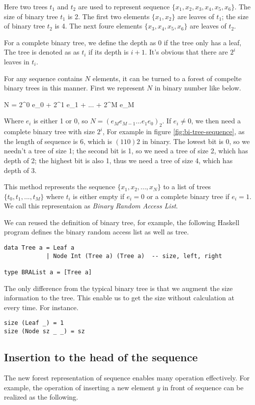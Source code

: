 \documentclass{article}
\begin{document}
Here two trees $t_1$ and $t_2$ are used to represent sequence $\{x_1, x_2, x_3, x_4, x_5, x_6\}$. 
The size of binary tree $t_1$ is 2. The first two elements $\{x_1, x_2\}$ are leaves of $t_1$;
the size of binary tree $t_2$ is 4. The next foure elements $\{x_3, x_4, x_5, x_6\}$ are leaves
of $t_2$. 

For a complete binary tree, we define the depth as 0 if the tree only has a leaf, 
The tree is denoted as as $t_i$ if its depth is $i+1$. It's obvious that there
are $2^i$ leaves in $t_i$.

For any sequence contains $N$ elements, it can be turned to a forest of compelte binary trees in this manner.
First we represent $N$ in binary number like below.

\be
N = 2^0 e_0 + 2^1 e_1 + ... + 2^M e_M
\ee

Where $e_i$ is either 1 or 0, so $N=(e_M e_{M-1} ... e_1 e_0)_2$. If $e_i \neq 0$, we then need a 
complete binary tree with size $2^i$,  For example in figure \ref{fig:bi-tree-sequence}, as the
length of sequence is 6, which is $(110)2$ in binary. The lowest bit is 0, so we needn't a tree
of size 1; the second bit is 1, so we need a tree of size 2, which has depth of 2; the highest
bit is also 1, thus we need a tree of size 4, which has depth of 3.

This method represents the sequence $\{x_1, x_2, ..., x_N\}$ to a list of trees $\{t_0, t_1, ..., t_M\}$
where $t_i$ is either empty if $e_i = 0$ or a complete binary tree if $e_i = 1$.
We call this representaion as {\em Binary Random Access List}.

We can reused the definition of binary tree, for example, the following Haskell program defines
the binary random access list as well as tree.

\lstset{language=Haskell}
\begin{lstlisting}
data Tree a = Leaf a
            | Node Int (Tree a) (Tree a)  -- size, left, right

type BRAList a = [Tree a]
\end{lstlisting}

The only difference from the typical binary tree is that we augment the size information to the tree.
This enable us to get the size without calculation at every time. For instance.

\begin{lstlisting}
size (Leaf _) = 1
size (Node sz _ _) = sz
\end{lstlisting}

\subsection{Insertion to the head of the sequence}
The new forest representation of sequence enables many operation effectively. For example, the
operation of inserting a new element $y$ in front of sequence can be realized as the following.
\end{document}

